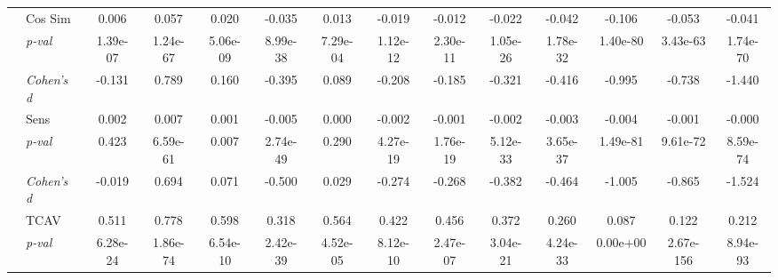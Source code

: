 \begin{table}[ht]
{\begin{tabular}{llcccccccccccc}
 \cmidrule(l){2-14}
 & Cos Sim & 0.006 & 0.057 & 0.020 & -0.035 & 0.013 & -0.019 & -0.012 & -0.022 & -0.042 & -0.106 & -0.053 & -0.041 \\
 & \footnotesize\color{gray}\textit{p-val} & \footnotesize\color{gray}1.39e-07 & \footnotesize\color{gray}1.24e-67 & \footnotesize\color{gray}5.06e-09 & \footnotesize\color{gray}8.99e-38 & \footnotesize\color{gray}7.29e-04 & \footnotesize\color{gray}1.12e-12 & \footnotesize\color{gray}2.30e-11 & \footnotesize\color{gray}1.05e-26 & \footnotesize\color{gray}1.78e-32 & \footnotesize\color{gray}1.40e-80 & \footnotesize\color{gray}3.43e-63 & \footnotesize\color{gray}1.74e-70 \\
 & \footnotesize\color{gray}\textit{Cohen's d} & \footnotesize\color{gray}-0.131 & \footnotesize\color{gray}0.789 & \footnotesize\color{gray}0.160 & \footnotesize\color{gray}-0.395 & \footnotesize\color{gray}0.089 & \footnotesize\color{gray}-0.208 & \footnotesize\color{gray}-0.185 & \footnotesize\color{gray}-0.321 & \footnotesize\color{gray}-0.416 & \footnotesize\color{gray}-0.995 & \footnotesize\color{gray}-0.738 & \footnotesize\color{gray}-1.440 \\
 \cmidrule(l){2-14}
 & Sens & 0.002 & 0.007 & 0.001 & -0.005 & 0.000 & -0.002 & -0.001 & -0.002 & -0.003 & -0.004 & -0.001 & -0.000 \\
 & \footnotesize\color{gray}\textit{p-val} & \footnotesize\color{gray}0.423 & \footnotesize\color{gray}6.59e-61 & \footnotesize\color{gray}0.007 & \footnotesize\color{gray}2.74e-49 & \footnotesize\color{gray}0.290 & \footnotesize\color{gray}4.27e-19 & \footnotesize\color{gray}1.76e-19 & \footnotesize\color{gray}5.12e-33 & \footnotesize\color{gray}3.65e-37 & \footnotesize\color{gray}1.49e-81 & \footnotesize\color{gray}9.61e-72 & \footnotesize\color{gray}8.59e-74 \\
 & \footnotesize\color{gray}\textit{Cohen's d} & \footnotesize\color{gray}-0.019 & \footnotesize\color{gray}0.694 & \footnotesize\color{gray}0.071 & \footnotesize\color{gray}-0.500 & \footnotesize\color{gray}0.029 & \footnotesize\color{gray}-0.274 & \footnotesize\color{gray}-0.268 & \footnotesize\color{gray}-0.382 & \footnotesize\color{gray}-0.464 & \footnotesize\color{gray}-1.005 & \footnotesize\color{gray}-0.865 & \footnotesize\color{gray}-1.524 \\
 \cmidrule(l){2-14}
 & TCAV & 0.511 & 0.778 & 0.598 & 0.318 & 0.564 & 0.422 & 0.456 & 0.372 & 0.260 & 0.087 & 0.122 & 0.212 \\
 & \footnotesize\color{gray}\textit{p-val} & \footnotesize\color{gray}6.28e-24 & \footnotesize\color{gray}1.86e-74 & \footnotesize\color{gray}6.54e-10 & \footnotesize\color{gray}2.42e-39 & \footnotesize\color{gray}4.52e-05 & \footnotesize\color{gray}8.12e-10 & \footnotesize\color{gray}2.47e-07 & \footnotesize\color{gray}3.04e-21 & \footnotesize\color{gray}4.24e-33 & \footnotesize\color{gray}0.00e+00 & \footnotesize\color{gray}2.67e-156 & \footnotesize\color{gray}8.94e-93 \\

\end{tabular}}
\end{table}

